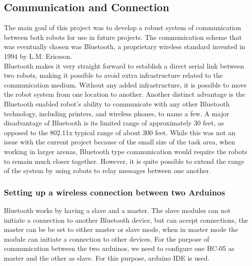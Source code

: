 \subsection{Communication and Connection}
The main goal of this project was to develop a robust system of communication between both
robots for use in future projects. The communication scheme that was eventually chosen was Bluetooth, a proprietary wireless standard invented in 1994 by L.M. Ericsson.\\
Bluetooth makes it very straight forward to establish a direct serial link between two robots,
making it possible to avoid extra infrastructure related to the communication medium. Without any added infrastructure, it is possible to move the robot system from one location to
another. Another distinct advantage is the Bluetooth enabled robot’s ability to communicate
with any other Bluetooth technology, including printers, and wireless phones, to name a few.
A major disadvantage of Bluetooth is its limited range of approximately 30 feet, as opposed
to the 802.11x typical range of about 300 feet. While this was not an issue with the current
project because of the small size of the task area, when working in larger arenas, Bluetooth
type communication would require the robots to remain much closer together. However, it is
quite possible to extend the range of the system by using robots to relay messages between
one another.
\subsubsection{Setting up a wireless connection between two Arduinos}
Bluetooth works by having a slave and a master. The slave modules can not initiate a connection to another Bluetooth device, but can accept connections, the master can be be set to either master or slave mode, when in master mode the module can initiate a connection to other devices. 
For the purpose of communication between the two arduinos, we need to configure one HC-05 as master and the other as slave. For this purpose, arduino IDE is used.
